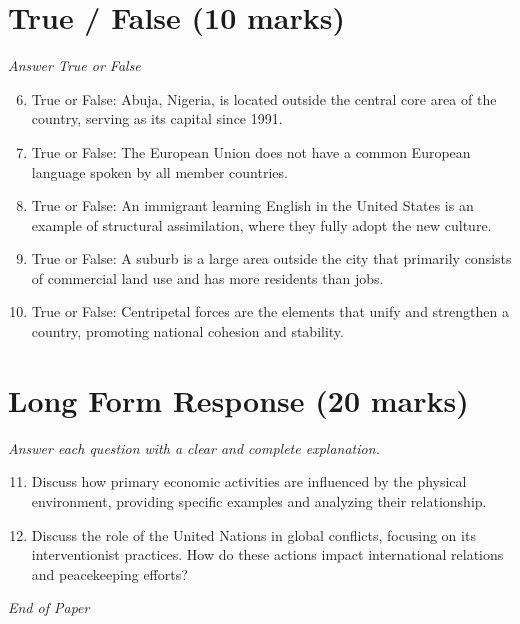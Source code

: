 \documentclass[12pt]{article}
\begin{document}
\section*{True / False (10 marks)}
\textit{Answer True or False}
\begin{enumerate}[label=\arabic*.]
\setcounter{enumi}{5}
\item True or False: Abuja, Nigeria, is located outside the central core area of the country, serving as its capital since 1991.
\item True or False: The European Union does not have a common European language spoken by all member countries.
\item True or False: An immigrant learning English in the United States is an example of structural assimilation, where they fully adopt the new culture.
\item True or False: A suburb is a large area outside the city that primarily consists of commercial land use and has more residents than jobs.
\item True or False: Centripetal forces are the elements that unify and strengthen a country, promoting national cohesion and stability.
\end{enumerate}

\section*{Long Form Response (20 marks)}
\textit{Answer each question with a clear and complete explanation.}
\begin{enumerate}[label=\arabic*.]
\setcounter{enumi}{10}
\item Discuss how primary economic activities are influenced by the physical environment, providing specific examples and analyzing their relationship.
\item Discuss the role of the United Nations in global conflicts, focusing on its interventionist practices. How do these actions impact international relations and peacekeeping efforts?
\end{enumerate}

\vfill
\noindent\textit{End of Paper}
\end{document}
